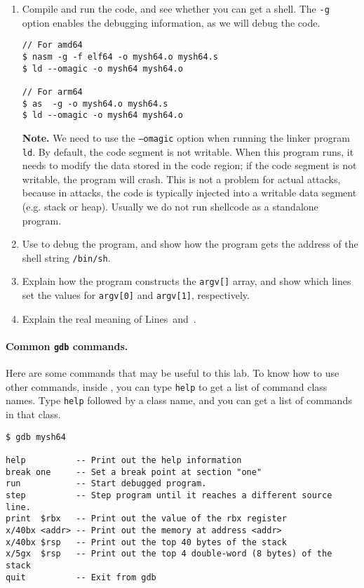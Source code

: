 \begin{enumerate}
\item Compile and run the code, and see whether you can
get a shell. The \texttt{-g} option enables the debugging 
information, as we will debug the code.  

\begin{lstlisting}
// For amd64
$ nasm -g -f elf64 -o mysh64.o mysh64.s 
$ ld --omagic -o mysh64 mysh64.o 

// For arm64
$ as  -g -o mysh64.o mysh64.s
$ ld --omagic -o mysh64 mysh64.o
\end{lstlisting}


\textbf{Note.} We need to use the \texttt{--omagic} option when running the
linker program \texttt{ld}. 
By default, the code segment is not writable.
When this program runs, it needs to modify the data stored
in the code region; if the code segment is not
writable, the program will crash.
This is not a problem for actual attacks, because
in attacks, the code is typically injected into a writable data
segment (e.g. stack or heap). Usually we do not run shellcode
as a standalone program.



\item Use \gdb to debug the program, and show how the program
gets the address of the shell string \texttt{/bin/sh}.  

\item Explain how the program constructs the 
\texttt{argv[]} array, and show which lines set the values
for \texttt{argv[0]} and \texttt{argv[1]}, respectively.   

\item Explain the real meaning of Lines~\lineone and~\linetwo. 
\end{enumerate}
 


\paragraph{Common \texttt{gdb} commands.} 
Here are some \gdb commands that may be useful to this lab. 
To know how to use other \gdb commands, 
inside \gdb, you can type \texttt{help} to get 
a list of command class names. Type \texttt{help} followed 
by a class name, and you can get a list of commands in that class.


\begin{lstlisting}
$ gdb mysh64

help          -- Print out the help information
break one     -- Set a break point at section "one"
run           -- Start debugged program.
step          -- Step program until it reaches a different source line.
print  $rbx   -- Print out the value of the rbx register
x/40bx <addr> -- Print out the memory at address <addr>
x/40bx $rsp   -- Print out the top 40 bytes of the stack
x/5gx  $rsp   -- Print out the top 4 double-word (8 bytes) of the stack
quit          -- Exit from gdb 
\end{lstlisting}


